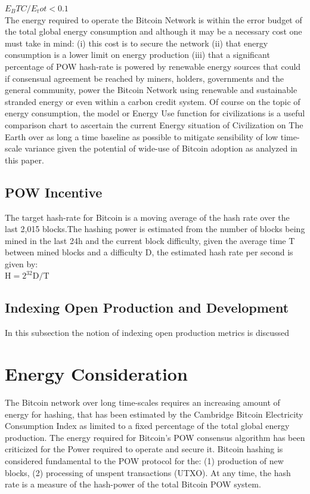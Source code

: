 \documentclass[final,5p,times,twocolumn,authoryear]{elsarticle}
\begin{document}
$E_BTC/E_tot < 0.1$
\\

The energy required to operate the Bitcoin Network is within the error budget of the total global energy consumption and although it may be a necessary cost one must take in mind: (i) this cost is to secure the network (ii) that energy consumption is a lower limit on energy production (iii) that a significant percentage of POW hash-rate is powered by renewable energy sources that could if consensual agreement be reached by miners,  holders, governments and the general community, power the Bitcoin Network using renewable and sustainable stranded energy or even within a carbon credit system. Of course on the topic of energy consumption, the \cite{kar64} model or Energy Use function for civilizations is a useful comparison chart to ascertain the current Energy situation of Civilization on The Earth over as long a time baseline as possible to mitigate sensibility of low time-scale variance given the potential of wide-use of Bitcoin adoption as analyzed in this paper.

 \subsection{POW Incentive}

The target hash-rate for Bitcoin is a moving average of the hash rate over the last 2,015 blocks.The hashing power is estimated from the number of blocks being mined in the last 24h and the current block difficulty, given the average time T between mined blocks and a difficulty D, the estimated hash rate per second is given by:\\

$\textrm{H} = 2^{32} \textrm{D} / \textrm{T}$\\

\subsection{Indexing Open Production and Development}
In this subsection the notion of indexing open production metrics is discussed

\section{Energy Consideration}
\label{sec:btc4}

The Bitcoin network over long time-scales requires an increasing amount of energy for hashing, that has been estimated by the Cambridge Bitcoin Electricity Consumption Index as limited to a fixed percentage of the total global energy production. The energy required for Bitcoin's POW consensus algorithm has been criticized for the Power required to operate and secure it. Bitcoin hashing is considered fundamental to the POW protocol for the: (1) production of new blocks, (2) processing of unspent transactions (UTXO). At any time, the hash rate is a measure of the hash-power of the total Bitcoin POW system.  
\end{document}
